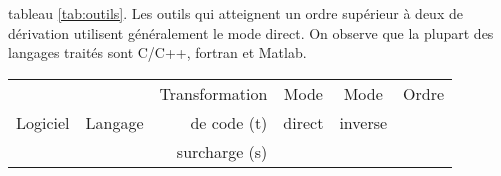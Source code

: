 tableau \ref{tab:outils}. Les outils qui atteignent un ordre sup\'erieur \`a deux de d\'erivation 
utilisent g\'en\'eralement le mode direct. On observe que la plupart des langages trait\'es sont
C/C++, fortran et Matlab.




\begin{table}[H]
	\begin{center}
{%
\small
\begin{tabular}{ | l | c | r | c | c | c | } \hline

           &         & Transformation            & Mode   & Mode      & Ordre  \\
  Logiciel & Langage & de code (t)               & direct &  inverse  &        \\
           &         & surcharge (s)             &        &           &        \\


\end{tabular}}
\end{center}
\end{table}
